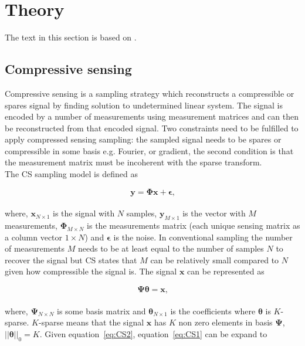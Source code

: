\section{Theory}
\label{sec:CS}
The text in this section is based on \cite{book:srr, book:sm, article:anew, article:atut}.

\subsection{Compressive sensing}
Compressive sensing is a sampling strategy which reconstructs a compressible or spares signal by finding solution to undetermined linear system. The signal is encoded by a number of measurements using measurement matrices and can then be reconstructed from that encoded signal. Two constraints need to be fulfilled to apply compressed sensing sampling: the sampled signal needs to be spares or compressible in some basis e.g. Fourier, or gradient, the second condition is that the measurement matrix must be incoherent with the sparse transform.\\[0.1in]

The CS sampling model is defined as

\begin{equation}
\label{eq:CS1}
   \mathbf{ y = \Phi x + \epsilon}\text{,}
\end{equation}\\[0.1in]

where, $\mathbf{x}_{N\times1}$ is the signal with $N$ samples, $\mathbf{y}_{M\times1}$ is the vector with $M$ measurements, $\mathbf{\Phi}_{M \times N}$ is the measurements matrix (each unique sensing matrix as a column vector $1 \times N$) and $\mathbf{\epsilon}$ is the noise. In conventional sampling the number of measurements $M$ needs to be at least equal to the number of samples $N$ to recover the signal but CS states that $M$ can be relatively small compared to $N$ given how compressible the signal is. The signal $\mathbf{x}$ can be represented as  

\begin{equation}
\label{eq:CS2}
   \mathbf{ \Psi \theta = x }\text{,}
\end{equation}\\[0.1in]

where, $\mathbf{\Psi}_{N \times N}$ is some  basis matrix and
$\mathbf{\theta}_{N\times1}$ is the coefficients where $\mathbf{\theta}$ is $K$-sparse. $K$-sparse means that the signal $\mathbf{x}$ has $K$ non zero elements in basis $\mathbf{\Psi}$, $||\mathbf{\theta}||_0 = K$. Given equation~\ref{eq:CS2}, equation~\ref{eq:CS1} can be expand to


